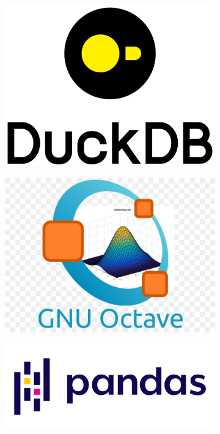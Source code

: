 \begin{figure}[h!]
  \centering
  \begin{subfigure}[b]{0.1\textwidth}
    \includegraphics[width=\textwidth]{Images/DuckDB_logo.svg.png}
    \label{fig:duckdb}
  \end{subfigure}
  \hfill
  \begin{subfigure}[b]{0.1\textwidth}
    \includegraphics[width=\textwidth]{Images/octave.png}
    \label{fig:octave}
  \end{subfigure}
  \hfill
  \begin{subfigure}[b]{0.1\textwidth}
    \includegraphics[width=\textwidth]{Images/Pandas_logo.svg.png}
    \label{fig:pandas}
  \end{subfigure}


\end{figure}
